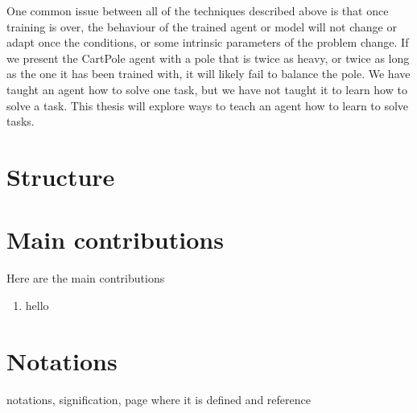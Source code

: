 One common issue between all of the techniques described above is that once
training is over, the behaviour of the trained agent or model will not change
or adapt once the conditions, or some intrinsic parameters of the problem
change. If we present the CartPole agent with a pole that is twice as heavy,
or twice as long as the one it has been trained with, it will likely fail to 
balance the pole. We have taught an agent how to solve one task, but we have
not taught it to learn how to solve a task. This thesis will explore ways to 
teach an agent how to learn to solve tasks.



\section{Structure}


\section{Main contributions}
\noindent
Here are the main contributions
\vspace{1cm}
\begin{enumerate}
    \item hello
\end{enumerate}

\clearpage
\section{Notations}

%
notations, signification, page where it is defined and reference
\
